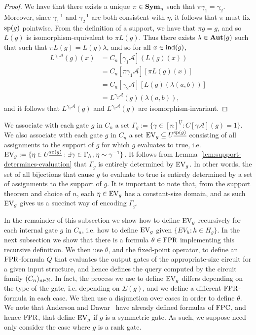 \documentclass[../paper.tex]{subfiles}
\begin{document}
\begin{proof}
	We have that there exists a unique $\pi \in \text{\textbf{Sym}}_n$ such that $\pi \gamma_1 =
  \gamma_2$. Moreover, since $\gamma^{-1}_1$ and $\gamma^{-1}_2$ are both
  consistent with $\eta$, it follows that $\pi$ must fix $\text{sp}(g)$ pointwise.
  From the definition of a support, we have that $\pi g = g$, and so $L(g)$ is
  isomorphism-equivalent to $\pi L(g)$. Thus there exists $\lambda \in \text{\textbf{Aut}}(g)$
  such that such that $\pi L(g) = L(g) \lambda$, and so for all $x \in \text{\upshape ind}(g)$,
	\begin{align*}
		L^{\gamma_1 \mathcal{A}}(g) (x) & = C_n[\gamma_1 \mathcal{A}](L(g)(x))                    \\
                                    & = C_n[\pi \gamma_1 \mathcal{A}][\pi L(g)(x)]            \\
                                    & = C_n[\gamma_2 \mathcal{A}][L(g)(\lambda(a,b))] \\
                                    & = L^{\gamma_2 \mathcal{A}}(g) (\lambda (a,b)),                 
	\end{align*}
	and it follows that $L^{\gamma_1 \mathcal{A}}(g)$ and $L^{\gamma_2
    \mathcal{A}}(g)$ are isomorphism-invariant.
\end{proof}

We associate with each gate $g$ in $C_n$ a set $\Gamma_g:= \{\gamma \in
[n]^{\underline{U}} : C[\gamma \mathcal{A}](g) = 1 \}$. We also associate with
each gate $g$ in $C_n$ a set $\text{EV}_g \subseteq U^{\underline{\text{sp}(g)}}$
consisting of all assignments to the support of $g$ for which $g$ evaluates to
true, i.e. $\text{EV}_g := \{ \eta \in U^{\underline{\text{sp}(g)}} : \exists \gamma \in
\Gamma_h \, ,\eta \sim \gamma^{-1}\}$. It follows from
Lemma~\ref{lem:support-determines-evaluation} that $\Gamma_g$ is entirely
determined by $\text{EV}_g$. In other words, the set of all bijections that cause $g$
to evaluate to true is entirely determined by a set of assignments to the
support of $g$. It is important to note that, from the support theorem and
choice of $n$, each $\eta \in \text{EV}_g$ has a constant-size domain, and as such
$\text{EV}_g$ gives us a succinct way of encoding $\Gamma_g$.

In the remainder of this subsection we show how to define $\text{EV}_g$ recursively
for each internal gate $g$ in $C_n$, i.e. how to define $\text{EV}_g$ given $\{EV_h :
h \in H_g \}$. In the next subsection we show that there is a formula $\theta
\in \text{\upshape FPR}$ implementing this recursive definition. We then use $\theta$, and the
fixed-point operator, to define an $\text{\upshape FPR}$-formula $Q$ that evaluates the output
gates of the appropriate-size circuit for a given input structure, and hence
defines the query computed by the circuit family $(C_n)_{n \in \mathbb{N}}$. In fact,
the process we use to define $\text{EV}_g$ differs depending on the type of the gate,
i.e. depending on $\Sigma(g)$, and we define a different $\text{\upshape FPR}$-formula in each
case. We then use a disjunction over cases in order to define $\theta$. We note
that Anderson and Dawar~\cite{AndersonD17} have already defined formulas of
$\text{\upshape FPC}$, and hence $\text{\upshape FPR}$, that define $\text{EV}_g$ if $g$ is a symmetric gate. As
such, we suppose need only consider the case where $g$ is a rank gate.
\end{document}

